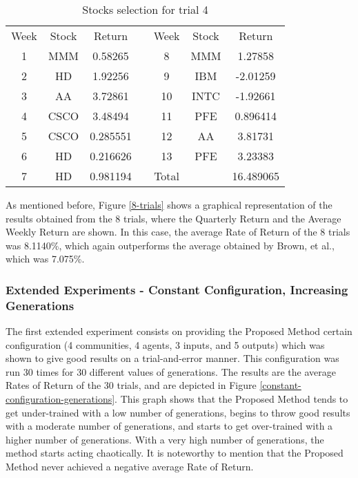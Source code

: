 \documentclass[12pt,journal,draftcls,onecolumn]{IEEEtran}
\begin{document}
\begin{table}
    \label{best-trial-table}
    \begin{tabular}{ c c c c c c c }
        Week & Stock & Return &  & Week & Stock & Return \\ 
        1 & MMM & 0.58265 &  & 8 & MMM & 1.27858 \\ 
        2 & HD & 1.92256 &  & 9 & IBM & -2.01259 \\ 
        3 & AA & 3.72861 &  & 10 & INTC & -1.92661 \\ 
        4 & CSCO & 3.48494 &  & 11 & PFE & 0.896414 \\ 
        5 & CSCO & 0.285551 &  & 12 & AA & 3.81731 \\ 
        6 & HD & 0.216626 &  & 13 & PFE & 3.23383 \\ 
        7 & HD & 0.981194 &  & Total &  & 16.489065 \\ 
    \end{tabular} 
    \caption{Stocks selection for trial 4} 
\end{table}

As mentioned before, Figure \ref{8-trials} shows a graphical representation of the results obtained from the 8 trials, where the Quarterly Return and the Average Weekly Return are shown. In this case, the average Rate of Return of the 8 trials was 8.1140\%, which again outperforms the average obtained by Brown, et al., which was 7.075\%.

\subsubsection{Extended Experiments - Constant Configuration, Increasing Generations}

The first extended experiment consists on providing the Proposed Method certain configuration (4 communities, 4 agents, 3 inputs, and 5 outputs) which was shown to give good results on a trial-and-error manner. This configuration was run 30 times for 30 different values of generations. The results are the average Rates of Return of the 30 trials, and are depicted in Figure \ref{constant-configuration-generations}. This graph shows that the Proposed Method tends to get under-trained with a low number of generations, begins to throw good results with a moderate number of generations, and starts to get over-trained with a higher number of generations. With a very high number of generations, the method starts acting chaotically. It is noteworthy to mention that the Proposed Method never achieved a negative average Rate of Return.
\end{document}
